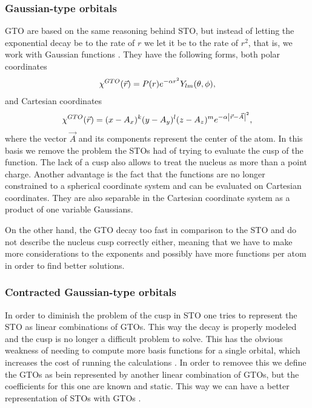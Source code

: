 \documentclass[../master_thesis.tex]{subfiles}
\begin{document}
\subsubsection{Gaussian-type orbitals}
\ac{GTO} are based on the same reasoning behind \ac{STO}, but instead of letting
the exponential decay be to the rate of  $r$ we let it be to the rate of $r^2$,
that is, we work with Gaussian functions \cite{ESQCB1P1}.
They have the following
forms, both polar coordinates
\begin{equation}
  \chi^{GTO}(\vec{r}) = P(r)e^{-\alpha r^2}Y_{lm}(\theta, \phi),
\end{equation}
and Cartesian coordinates
\begin{equation}
\chi^{GTO}(\vec{r}) = (x - A_x)^k(y - A_y)^l(z - A_z)^me^{-\alpha\abs{\vec{r} - \vec{A}}^2},
\end{equation}
where the vector $\vec{A}$ and its components represent the center of the atom.
In this basis we remove the problem the \acp{STO} had of trying to evaluate the
cusp of the function. The lack of a cusp also allows to treat the nucleus as
more than a point charge. Another advantage is the fact that the functions are no
longer constrained to a spherical coordinate system and can be evaluated on Cartesian
coordinates. They are also separable in the Cartesian coordinate system as a product of
one variable Gaussians.

On the other hand, the \ac{GTO} decay too fast in comparison to the \ac{STO} and
do not describe the nucleus cusp correctly either, meaning that we have to make
more considerations to the exponents and possibly have more
functions per atom in order to find better solutions.

\subsubsection{Contracted Gaussian-type orbitals}
In order to diminish the problem of the cusp in \ac{STO} one tries to represent the
\ac{STO} as linear combinations of \acp{GTO}. This way the decay is properly modeled and the
cusp is no longer a difficult problem to solve. This has the obvious weakness of needing
to compute more basis functions for a single orbital, which increases the cost of running
the calculations \cite{Cramer:2004}. In order to removee this we define the \acp{GTO}
as bein represented by another linear combination of \acp{GTO}, but the coefficients for
this one are known and static. This way we can have a better representation of \acp{STO}
with \acp{GTO} \cite{Jensen:2017}.
\end{document}

